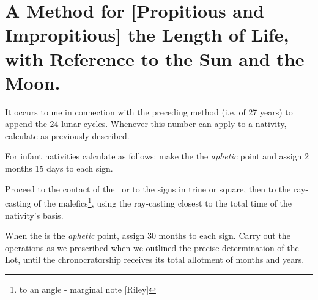 \section{A Method for [Propitious and Impropitious] the Length of Life, with Reference to the Sun and the Moon.}
It occurs to me in connection with the preceding method (i.e. of 27 years) to append the 24 lunar cycles. Whenever this number can apply to a nativity, calculate as previously described. 

For infant nativities calculate as follows: make the \Moon\xspace the \textit{aphetic} point and assign 2 months 15 days to each sign.

Proceed to the contact of the \Moon\, or to the signs in trine or square, then to the ray-casting of the malefics\footnote{to an angle - marginal note [Riley]}, using the ray-casting closest to the total time of the nativity’s basis. 

When the \Sun\xspace is the \textit{aphetic} point, assign 30 months to each sign. Carry out the operations as we prescribed when we outlined
the precise determination of the Lot, until the chronocratorship receives its total allotment of months and years.

\newpage